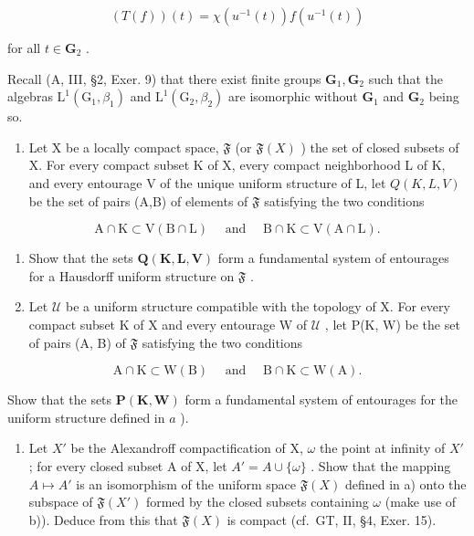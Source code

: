 \[
(T (f)) (t) = \chi (u ^ {- 1} (t)) f (u ^ {- 1} (t))
\]

for all \(t \in \mathbf{G}_2\) .

Recall (A, III, §2, Exer. 9) that there exist finite groups \(\mathbf{G}_1, \mathbf{G}_2\) such that the algebras \(\mathrm{L}^1(\mathrm{G}_1, \beta_1)\) and \(\mathrm{L}^1(\mathrm{G}_2, \beta_2)\) are isomorphic without \(\mathbf{G}_1\) and \(\mathbf{G}_2\) being so.

\exercisesection{}

\begin{enumerate}
\def\labelenumi{\arabic{enumi})}
\tightlist
\item
  Let X be a locally compact space, \(\mathfrak{F}\) (or \(\mathfrak{F}(X)\) ) the set of closed subsets of X. For every compact subset K of X, every compact neighborhood L of K, and every entourage V of the unique uniform structure of L, let \(Q(K,L,V)\) be the set of pairs (A,B) of elements of \(\mathfrak{F}\) satisfying the two conditions
\end{enumerate}

\[
\mathrm{A} \cap \mathrm{K} \subset \mathrm{V} (\mathrm{B} \cap \mathrm{L}) \quad \text { and } \quad \mathrm{B} \cap \mathrm{K} \subset \mathrm{V} (\mathrm{A} \cap \mathrm{L}).
\]

\begin{enumerate}
\def\labelenumi{\alph{enumi})}
\item
  Show that the sets \(\mathbf{Q}(\mathbf{K},\mathbf{L},\mathbf{V})\) form a fundamental system of entourages for a Hausdorff uniform structure on \(\mathfrak{F}\) .
\item
  Let \(\mathcal{U}\) be a uniform structure compatible with the topology of X. For every compact subset K of X and every entourage W of \(\mathcal{U}\) , let P(K, W) be the set of pairs (A, B) of \(\mathfrak{F}\) satisfying the two conditions
\end{enumerate}

\[
\mathrm{A} \cap \mathrm{K} \subset \mathrm{W} (\mathrm{B}) \quad \text { and } \quad \mathrm{B} \cap \mathrm{K} \subset \mathrm{W} (\mathrm{A}).
\]

Show that the sets \(\mathbf{P}(\mathbf{K},\mathbf{W})\) form a fundamental system of entourages for the uniform structure defined in \(a\) ).

\begin{enumerate}
\def\labelenumi{\alph{enumi})}
\setcounter{enumi}{2}
\tightlist
\item
  Let \(X'\) be the Alexandroff compactification of X, \(\omega\) the point at infinity of \(X'\) ; for every closed subset A of X, let \(A' = A \cup \{\omega\}\) . Show that the mapping \(A \mapsto A'\) is an isomorphism of the uniform space \(\mathfrak{F}(X)\) defined in a) onto the subspace of \(\mathfrak{F}(X')\) formed by the closed subsets containing \(\omega\) (make use of b)). Deduce from this that \(\mathfrak{F}(X)\) is compact (cf.~GT, II, §4, Exer. 15).
\end{enumerate}

